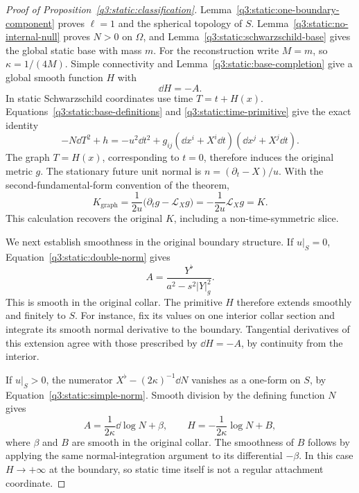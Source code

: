 \begin{proof}[Proof of Proposition~\ref{q3:static:classification}]
Lemma~\ref{q3:static:one-boundary-component} proves $\ell=1$ and the
spherical topology of $S$. Lemma~\ref{q3:static:no-internal-null} proves
\(N>0\) on \(\Omega\), and
Lemma~\ref{q3:static:schwarzschild-base} gives the global static
base with mass \(m\).
For the reconstruction write \(M=m\), so \(\kappa=1/(4M)\).
Simple connectivity and Lemma~\ref{q3:static:base-completion}
give a global smooth function \(H\) with
\begin{equation}
\label{q3:static:time-primitive}
\dd H=-A.
\end{equation}
In static Schwarzschild coordinates use time \(T=t+H(x)\).
Equations~\eqref{q3:static:base-definitions} and
\eqref{q3:static:time-primitive} give the exact identity
\begin{equation}
\label{q3:static:reconstructed-metric}
-N\dd T^2+h
=-u^2\dd t^2+g_{ij}(\dd x^i+X^i\dd t)
                         (\dd x^j+X^j\dd t).
\end{equation}
The graph \(T=H(x)\), corresponding to \(t=0\), therefore induces
the original metric \(g\).
The stationary future unit normal is \(n=(\partial_t-X)/u\).
With the second-fundamental-form convention of the theorem,
\begin{equation}
\label{q3:static:reconstructed-k}
K_{\mathrm{graph}}
=\frac1{2u}\bigl(\partial_tg-\mathcal L_Xg\bigr)
=-\frac1{2u}\mathcal L_Xg
=K.
\end{equation}
This calculation recovers the original \(K\), including a
non-time-symmetric slice.

We next establish smoothness in the original boundary structure.
If \(u|_S=0\), Equation~\eqref{q3:static:double-norm} gives
\[
A=\frac{Y^\flat}{a^2-s^2|Y|_g^2}.
\]
This is smooth in the original collar.
The primitive \(H\) therefore extends smoothly and finitely to \(S\).
For instance, fix its values on one interior collar section and
integrate its smooth normal derivative to the boundary.
Tangential derivatives of this extension agree with those prescribed
by \(\dd H=-A\), by continuity from the interior.

If \(u|_S>0\), the numerator
\(X^\flat-(2\kappa)^{-1}\dd N\) vanishes as a one-form on \(S\),
by Equation~\eqref{q3:static:simple-norm}.
Smooth division by the defining function \(N\) gives
\begin{equation}
\label{q3:static:log-time}
A=\frac1{2\kappa}\dd\log N+\beta,\qquad
H=-\frac1{2\kappa}\log N+B,
\end{equation}
where \(\beta\) and \(B\) are smooth in the original collar.
The smoothness of \(B\) follows by applying the same normal-integration
argument to its differential \(-\beta\).
In this case \(H\to+\infty\) at the boundary, so static time itself
is not a regular attachment coordinate.


\end{proof}
